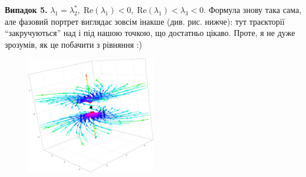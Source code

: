 \documentclass[oneside,solution]{tmpl}
\begin{document}
\textbf{Випадок 5.} $\lambda_1 = \lambda_2^*, \; \text{Re}(\lambda_1)<0, \; \text{Re}(\lambda_1)<\lambda_3<0$. Формула знову така сама, але фазовий портрет виглядає зовсім інакше (див. рис. нижче): тут траєкторії ``закручуються'' над і під нашою точкою, що достатньо цікаво. Проте, я не дуже зрозумів, як це побачити з рівняння :)
\begin{figure}[H]
    \centering
    \includegraphics[width=0.5\textwidth]{images/hw_8/case_5.pdf}
\end{figure}
\end{document}
